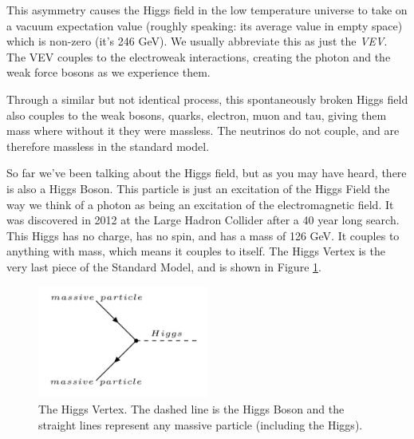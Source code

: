 This asymmetry causes the Higgs field in the low temperature universe to take on a vacuum expectation value (roughly speaking: its average value in empty space) which is non-zero (it's 246 GeV). We usually abbreviate this as just the \textit{VEV}. The VEV couples to the electroweak interactions, creating the photon and the weak force bosons as we experience them.

Through a similar but not identical process, this spontaneously broken Higgs field also couples to the weak bosons, quarks, electron, muon and tau, giving them mass where without it they were massless. The neutrinos do not couple, and are therefore massless in the standard model.

So far we've been talking about the Higgs field, but as you may have heard, there is also a Higgs Boson. This particle is just an excitation of the Higgs Field the way we think of a photon as being an excitation of the electromagnetic field. It was discovered in 2012 at the Large Hadron Collider after a 40 year long search. This Higgs has no charge, has no spin, and has a mass of 126 GeV. It couples to anything with mass, which means it couples to itself. The Higgs Vertex is the very last piece of the Standard Model, and is shown in Figure \ref{Fig:Intro:Vertex4}.
\begin{figure}[h]
    \centering
        \includegraphics[width=0.5\textwidth]{F1/Vertex4}
        \caption{The Higgs Vertex. The dashed line is the Higgs Boson and the straight lines represent any massive particle (including the Higgs).}
        \label{Fig:Intro:Vertex4}
\end{figure}
